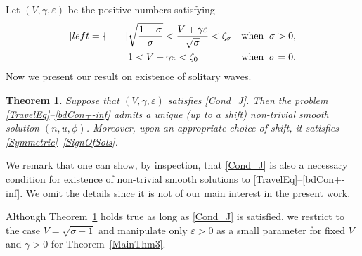 \documentclass{amsart}
\newcommand{\veps}{\varepsilon}
\numberwithin{equation}{section}
\theoremstyle{plain}%
\newtheorem{theorem}{Theorem}[section]
\newtheorem{corollary}[theorem]{Corollary}
\theoremstyle{definition}
\newtheorem{assume}{Assumption}
\theoremstyle{remark}
\theoremstyle{remark}
\begin{document}
Let $(V, \gamma, \veps)$ be the positive numbers satisfying
\begin{subequations}\label{Cond_J}
\begin{align}[left = \empheqlbrace\qquad]
& \sqrt{\frac{1+\sigma}{\sigma}} < \frac{V+\gamma\veps}{\sqrt{\sigma}} < \zeta_{\sigma} & \text{when} \;\; \sigma>0, \label{Cond_JHot} \\
& 1 < V+\gamma\veps < \zeta_0 & \text{when} \;\; \sigma=0. \label{Cond_JCold}
\end{align}
\end{subequations}
Now we present our result on existence of  solitary waves. 
\begin{theorem}\label{MainThm} Suppose that $(V, \gamma, \veps)$ satisfies \eqref{Cond_J}.
Then the problem \eqref{TravelEq}--\eqref{bdCon+-inf} admits a unique (up to a shift) non-trivial smooth solution $(n,u,\phi)$. Moreover, upon an appropriate choice of shift, it satisfies \eqref{Symmetric}--\eqref{SignOfSols}. 
\end{theorem}

We remark that one can show, by inspection, that \eqref{Cond_J} is also a necessary condition for existence of non-trivial smooth solutions to \eqref{TravelEq}--\eqref{bdCon+-inf}. We omit the details since it is not of our main interest in the present work.

Although Theorem~\ref{MainThm}  
 holds true as long as \eqref{Cond_J} is satisfied, we restrict to the case $V=\sqrt{\sigma +1}$ and manipulate  only $\veps>0$ as a small parameter for fixed $V$ and $\gamma>0$ for Theorem~\ref{MainThm3}.
%
%
  
\end{document}
